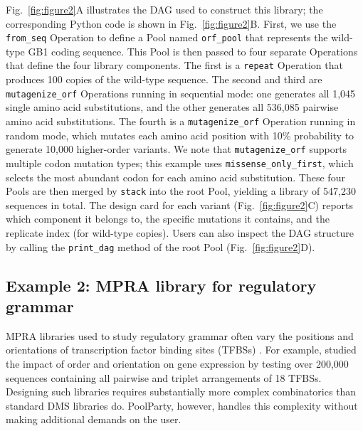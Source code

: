 \documentclass[pdflatex,sn-vancouver-num,referee,lineno,oneside]{sn-jnl}
\begin{document}
Fig.\ \ref{fig:figure2}A illustrates the DAG used to construct this library; the corresponding Python code is shown in Fig.\ \ref{fig:figure2}B. First, we use the \texttt{from\_seq} Operation to define a Pool named \texttt{orf\_pool} that represents the wild-type GB1 coding sequence. This Pool is then passed to four separate Operations that define the four library components. The first is a \texttt{repeat} Operation that produces 100 copies of the wild-type sequence. The second and third are \texttt{mutagenize\_orf} Operations running in sequential mode: one generates all 1,045 single amino acid substitutions, and the other generates all 536,085 pairwise amino acid substitutions. The fourth is a \texttt{mutagenize\_orf} Operation running in random mode, which mutates each amino acid position with 10\% probability to generate 10,000 higher-order variants. We note that \texttt{mutagenize\_orf} supports multiple codon mutation types; this example uses \texttt{missense\_only\_first}, which selects the most abundant codon for each amino acid substitution. These four Pools are then merged by \texttt{stack} into the root Pool, yielding a library of 547,230 sequences in total. The design card for each variant (Fig.~\ref{fig:figure2}C) reports which component it belongs to, the specific mutations it contains, and the replicate index (for wild-type copies). Users can also inspect the DAG structure by calling the \texttt{print\_dag} method of the root Pool (Fig.~\ref{fig:figure2}D).

\subsection{Example 2: MPRA library for regulatory grammar}\label{subsec:example2-mpra}

MPRA libraries used to study regulatory grammar often vary the positions and orientations of transcription factor binding sites (TFBSs) \citep{Melnikov2012dw, Sharon2012io, King2020aa, Smith2013kn, Grossman2017aa, WeingartenGabbay2019bl, GeorgakopoulosSoares2023tf}. For example, \citet{GeorgakopoulosSoares2023tf} studied the impact of order and orientation on gene expression by testing over 200,000 sequences containing all pairwise and triplet arrangements of 18 TFBSs. Designing such libraries requires substantially more complex combinatorics than standard DMS libraries do. PoolParty, however, handles this complexity without making additional demands on the user.
\end{document}
